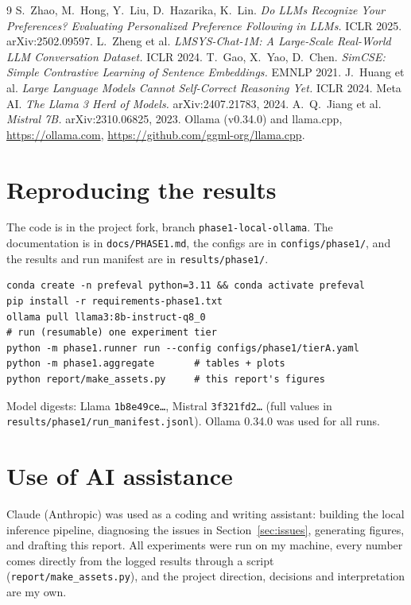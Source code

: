 \documentclass[11pt,a4paper]{article}
\begin{document}
\begin{thebibliography}{9}\small
{} S.~Zhao, M.~Hong, Y.~Liu, D.~Hazarika, K.~Lin.
  \emph{Do LLMs Recognize Your Preferences? Evaluating Personalized Preference Following in LLMs.} ICLR 2025. arXiv:2502.09597.
 L.~Zheng et al. \emph{LMSYS-Chat-1M: A Large-Scale Real-World LLM Conversation Dataset.} ICLR 2024.
 T.~Gao, X.~Yao, D.~Chen. \emph{SimCSE: Simple Contrastive Learning of Sentence Embeddings.} EMNLP 2021.
 J.~Huang et al. \emph{Large Language Models Cannot Self-Correct Reasoning Yet.} ICLR 2024.
 Meta AI. \emph{The Llama 3 Herd of Models.} arXiv:2407.21783, 2024.
 A.~Q.~Jiang et al. \emph{Mistral 7B.} arXiv:2310.06825, 2023.
 Ollama (v0.34.0) and llama.cpp, \url{https://ollama.com}, \url{https://github.com/ggml-org/llama.cpp}.
\end{thebibliography}

\appendix
\section{Reproducing the results}
The code is in the project fork, branch \nolinkurl{phase1-local-ollama}. The documentation is in \nolinkurl{docs/PHASE1.md}, the
configs are in \nolinkurl{configs/phase1/}, and the results and run manifest are in \nolinkurl{results/phase1/}.
\begin{verbatim}
conda create -n prefeval python=3.11 && conda activate prefeval
pip install -r requirements-phase1.txt
ollama pull llama3:8b-instruct-q8_0
# run (resumable) one experiment tier
python -m phase1.runner run --config configs/phase1/tierA.yaml
python -m phase1.aggregate       # tables + plots
python report/make_assets.py     # this report's figures
\end{verbatim}
Model digests: Llama \texttt{1b8e49ce\dots}, Mistral \texttt{3f321fd2\dots}
(full values in \nolinkurl{results/phase1/run_manifest.jsonl}). Ollama 0.34.0 was used for all runs.

\section{Use of AI assistance}
Claude (Anthropic) was used as a coding and writing assistant: building the local inference pipeline, diagnosing the issues in
Section~\ref{sec:issues}, generating figures, and drafting this report. All experiments were run on my machine, every number
comes directly from the logged results through a script (\texttt{report/make\_assets.py}), and the project direction, decisions
and interpretation are my own.
\end{document}

